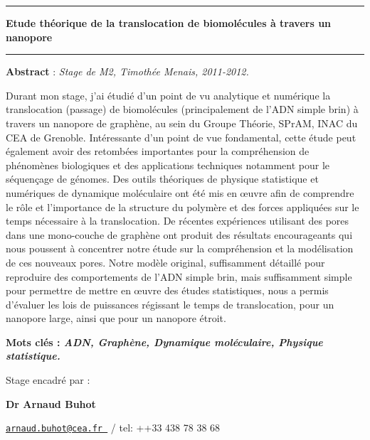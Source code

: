 \documentclass[a4paper,11pt]{article}
\begin{document}
\begin{center}

\vspace{1.5cm}

\rule[11pt]{5cm}{0.5pt}

\textbf{\huge Etude théorique de la translocation de
biomolécules à travers un nanopore}

\rule{5cm}{0.5pt}

\vspace{1.5cm}

\parbox{15cm}{\small
\textbf{Abstract} : \it Stage de M2, Timothée Menais, 2011-2012.

\vspace{0.5cm}
\rm Durant mon stage, j'ai étudié d'un point de vu analytique et numérique la translocation (passage) de biomolécules (principalement de l'ADN simple brin) à travers un nanopore de graphène, au sein du Groupe Théorie, SPrAM, INAC du CEA de Grenoble. Intéressante d'un point de vue fondamental, cette étude peut également avoir des retombées importantes pour la compréhension de phénomènes biologiques et des applications techniques notamment pour le séquençage de génomes. Des outils théoriques de physique statistique et numériques de dynamique moléculaire ont été mis en œuvre afin de comprendre le rôle et l'importance de la structure du polymère et des forces appliquées sur le temps nécessaire à la translocation. De récentes expériences utilisant des pores dans une mono-couche de graphène ont produit des résultats encourageants qui nous poussent à concentrer notre étude sur la compréhension et la modélisation de ces nouveaux pores. Notre modèle original, suffisamment détaillé pour reproduire des comportements de l'ADN simple brin, mais suffisamment simple pour permettre de mettre en œuvre des études statistiques, nous a permis d'évaluer les lois de puissances régissant le temps de translocation, pour un nanopore large, ainsi que pour un nanopore étroit.
} %


\vspace{0.5cm}

\parbox{15cm}{
\textbf{Mots clés : \it ADN, Graphène, Dynamique moléculaire, Physique statistique.} }%

\vspace{0.5cm}

\parbox{15cm}{
Stage encadré par :

{\bf Dr Arnaud Buhot }

\href{mailto:	arnaud.buhot@cea.fr }{\tt 	arnaud.buhot@cea.fr }  / tel: ++33 438 78 38 68

}
\end{center}
\end{document}
